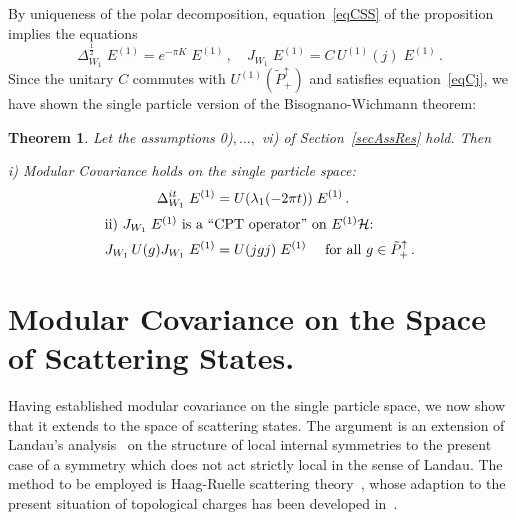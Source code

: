 \documentclass[a4paper,reqno,11pt]{amsart}
\theoremstyle{plain}
\newtheorem{Thm}{Theorem}%
\theoremstyle{definition}
\numberwithin{equation}{section}
\newcommand{\calH}{{\mathcal H}}
\newcommand{\Potild}{\tilde{P}_+^{\uparrow}}
\newcommand{\half}{{\frac{1}{2}}}
\newcommand{\DWR}{\Delta_{W_1}}  %
\newcommand{\JWR}{J_{W_1}}  %
\newcommand{\Ue}{U^{(1)}}
\newcommand{\Uej}{U^{(1)}(j)}
\newcommand{\Ee}{E^{(1)}}
\newcommand{\Cop}{C}        %
\begin{document}
By uniqueness of the polar decomposition, equation~\eqref{eqCSS} of the 
proposition implies the equations 
\begin{equation*} 
 \DWR^{\half}\;\Ee= e ^{-\pi K}\;\Ee\,,
\quad \JWR\;\Ee  = \Cop\,\Uej\;\Ee \,.
\end{equation*}
Since the unitary $\Cop$ commutes with $\Ue(\Potild)$ and satisfies
equation~\eqref{eqCj}, we have shown the 
single particle version of the Bisognano-Wichmann theorem: 
\begin{Thm} \label{ThmModCov1} 
Let the assumptions 0)$,\ldots,$ vi) of Section~\ref{secAssRes} hold. Then 

\noindent i)  Modular Covariance holds on the single particle space: 
\begin{align}  \label{eqModCov1}
   \DWR^{it}\;\Ee&= U(\lambda_1(-2\pi t))\;\Ee\,. \\
\intertext{ii) $\JWR\;\Ee$ is a ``CPT operator'' on $\Ee\calH$:} 
   \JWR\,U(g)\JWR\;\Ee &=U(jgj) \;\Ee \quad\text{ for all } g\in\Potild\,. 
  \label{eqJgJ1}
\end{align}
\end{Thm}
\section{Modular Covariance on the Space of Scattering States.} \label{secHex} 
Having established modular covariance on the single particle space, we
now show that it extends to the space of scattering states. The
argument is an extension of Landau's analysis~\cite{Landau} on the
structure of local internal symmetries to the present case of a symmetry which
does not act strictly local in the sense of Landau. The method 
to be employed is Haag-Ruelle scattering theory~\cite{Hepp, Jost},
whose adaption to the present situation of topological charges has
been developed in~\cite{BuF}. 
\end{document}

